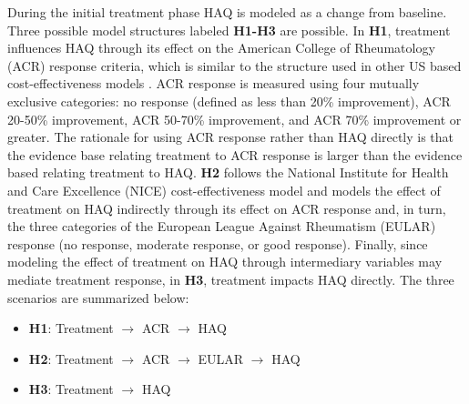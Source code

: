 \documentclass[11pt,final,fleqn]{article}\usepackage[]{graphicx}\usepackage[]{color}
\theoremstyle{plain}
\begin{document}
During the initial treatment phase HAQ is modeled as a change from baseline. Three possible model structures labeled \textbf{H1-H3} are possible. In \textbf{H1}, treatment influences HAQ through its effect on the American College of Rheumatology (ACR) response criteria, which is similar to the structure used in other US based cost-effectiveness models \citep[e.g.][]{carlson2015economic, icer2017tim}. ACR response is measured using four mutually exclusive categories: no response (defined as less than 20\% improvement), ACR 20-50\% improvement, ACR 50-70\% improvement, and ACR 70\% improvement or greater. The rationale for using ACR response rather than HAQ directly is that the evidence base relating treatment to ACR response is larger than the evidence based relating treatment to HAQ. \textbf{H2} follows the National Institute for Health and Care Excellence (NICE) cost-effectiveness model \citep{stevenson2016adalimumab, stevenson2017cost} and models the effect of treatment on HAQ indirectly through its effect on ACR response and, in turn, the three categories of the European League Against Rheumatism (EULAR) response (no response, moderate response, or good response). Finally, since modeling the effect of treatment on HAQ through intermediary variables may mediate treatment response, in \textbf{H3}, treatment impacts HAQ directly. The three scenarios are summarized below: 

\begin{itemize}
\item \textbf{H1}: Treatment $\rightarrow$ ACR $\rightarrow$ HAQ
\item \textbf{H2}: Treatment $\rightarrow$ ACR $\rightarrow$ EULAR $\rightarrow$ HAQ
\item \textbf{H3}: Treatment $\rightarrow$ HAQ
\end{itemize}
\end{document}
